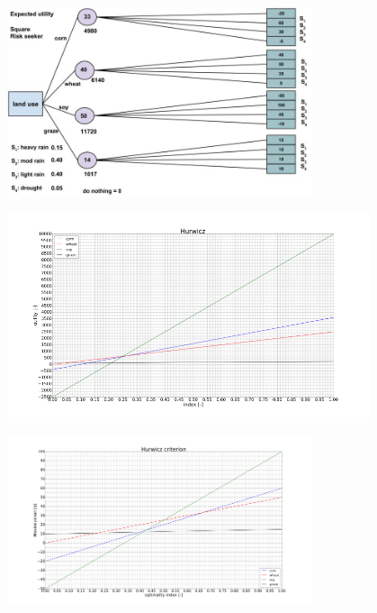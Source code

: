 \documentclass[aspectratio=1610,pdftex,dvipsnames,compress,xcolor={dvipsnames}]{beamer}
\begin{document}
\begin{frame}{}
    \begin{figure}
        \centering
        \includegraphics[width=0.80\textwidth]{decision.tree_risk.seeker.jpg}
    \end{figure}
\end{frame}


\begin{frame}{}
    \begin{figure}
        \centering
        \includegraphics[width=0.95\textwidth]{hurwicz_risk.seeker.jpg}
    \end{figure}
\end{frame}


\begin{frame}{}
    \begin{figure}
        \centering
        \includegraphics[width=0.80\textwidth]{land.use.hurwicz.jpg}
    \end{figure}
\end{frame}
\end{document}
